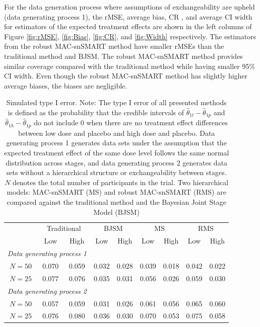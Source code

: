 For the data generation process where assumptions of exchangeability are upheld (data generating process 1), the \ac{rMSE}, average bias,  \ac{CR} , and average \ac{CI} width for estimators of the expected treatment effects are shown in the left columns of Figure \ref{fig:rMSE}, \ref{fig:Bias}, \ref{fig:CR}, and \ref{fig:Width} respectively. The estimators from the robust MAC-snSMART method have smaller \ac{rMSE}s than the traditional method and \ac{BJSM}. The robust MAC-snSMART method provides similar coverage compared with the traditional method while having smaller 95\% \ac{CI} width. Even though the robust MAC-snSMART method has slightly higher average biases, the biases are negligible.
\begin{table} 
\caption{\label{tab:TypeI} Simulated type I error. Note: The type I error of all presented methods is defined as the probability that the credible intervals of $\widehat{\theta}_{1l} - \widehat{\theta}_{1p}$ and $\widehat{\theta}_{1h} - \widehat{\theta}_{1p}$ do not include 0 when there are no treatment effect differences between low dose and placebo and high dose and placebo. Data generating process 1 generates data sets under the assumption that the expected treatment effect of the same dose level follows the same normal distribution across stages, and data generating process 2 generates data sets without a hierarchical structure or exchangeability between stages. $N$ denotes the total number of participants in the trial. Two hierarchical models: MAC-snSMART (MS) and robust MAC-snSMART (RMS) are compared against the traditional method and the Bayesian Joint Stage Model (BJSM)}
\centering
\begin{tabular}{ccccccccc}
\hline
\centering \multirow{2}{*}{Sample Size} & \multicolumn{2}{c}{Traditional} & \multicolumn{2}{c}{BJSM} & \multicolumn{2}{c}{MS} & \multicolumn{2}{c}{RMS}\\
\centering  & Low & High & Low & High & Low & High & Low & High \\
\hline
\multicolumn{3}{l}{\textit{Data generating process 1}} &&&& \\
$N = 50$ & 0.070 & 0.059  & 0.032 & 0.028 & 0.039 & 0.018 & 0.042 & 0.022 \\
$N = 25$ & 0.077 & 0.076 & 0.035 & 0.031 & 0.056 & 0.026 & 0.059 & 0.030 \\
\multicolumn{3}{l}{\textit{Data generating process 2}} &&&& \\
$N = 50$ & 0.057 & 0.059 & 0.031 & 0.026 & 0.061 & 0.056 & 0.065 & 0.060 \\
$N = 25$ & 0.076 & 0.080 & 0.036 & 0.030 & 0.070 & 0.053 & 0.075 & 0.058\\
\hline
\end{tabular}
\end{table}

